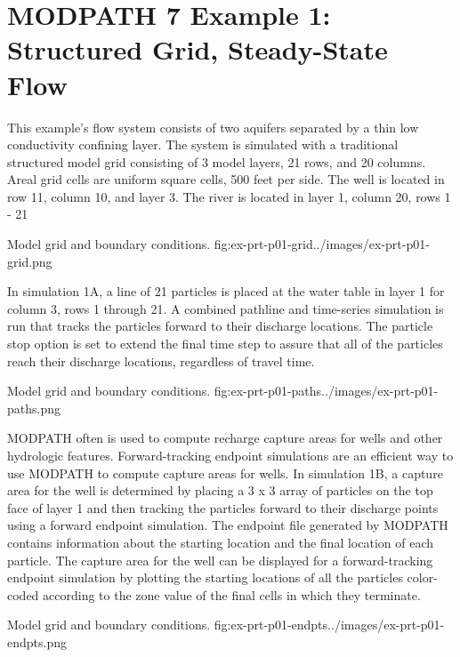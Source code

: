 \section{MODPATH 7 Example 1: Structured Grid, Steady-State Flow}

This example's flow system consists of two aquifers separated by a thin low conductivity confining layer. The system is simulated with a traditional structured model grid consisting of 3 model layers, 21 rows, and 20 columns. Areal grid cells are uniform square cells, 500 feet per side. The well is located in row 11, column 10, and layer 3. The river is located in layer 1, column 20, rows 1 - 21

\begin{StandardFigure}{
    Model grid and boundary conditions.
    }{fig:ex-prt-p01-grid}{../images/ex-prt-p01-grid.png}
\end{StandardFigure}

In simulation 1A, a line of 21 particles is placed at the water table in layer 1 for column 3, rows 1 through 21. A combined pathline and time-series simulation is run that tracks the particles forward to their discharge locations. The particle stop option is set to extend the final time step to assure that all of the particles reach their discharge locations, regardless of travel time.

\begin{StandardFigure}{
    Model grid and boundary conditions.
    }{fig:ex-prt-p01-paths}{../images/ex-prt-p01-paths.png}
\end{StandardFigure}

MODPATH often is used to compute recharge capture areas for wells and other hydrologic features. Forward-tracking endpoint simulations are an efficient way to use MODPATH to compute capture areas for wells. In simulation 1B, a capture area for the well is determined by placing a 3 x 3 array of particles on the top face of layer 1 and then tracking the particles forward to their discharge points using a forward endpoint simulation. The endpoint file generated by MODPATH contains information about the starting location and the final location of each particle. The capture area for the well can be displayed for a forward-tracking endpoint simulation by plotting the starting locations of all the particles color-coded according to the zone value of the final cells in which they terminate.

\begin{StandardFigure}{
    Model grid and boundary conditions.
    }{fig:ex-prt-p01-endpts}{../images/ex-prt-p01-endpts.png}
\end{StandardFigure}

